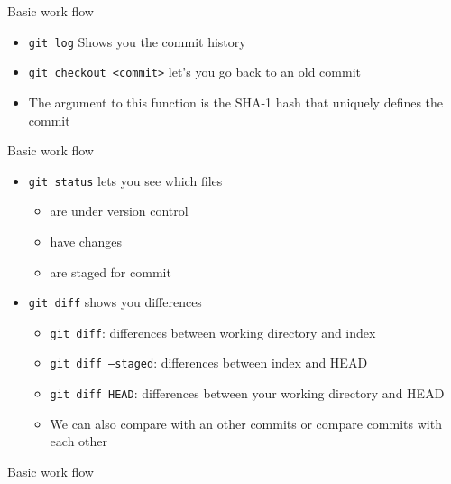 \documentclass[12pt]{beamer}
\begin{document}
\begin{frame}[fragile]{Basic work flow}
	\begin{itemize}
		\item \texttt{git log} Shows you the commit history 
		\item \texttt{git checkout <commit>} let's you go back to an old commit
		\item The argument to this function is the SHA-1 hash that uniquely defines the commit
	\end{itemize}
\end{frame}


\begin{frame}[fragile]{Basic work flow}
\begin{itemize}
\item \texttt{git status} lets you see which files
\begin{itemize}
\item are under version control
\item have changes
\item are staged for commit
\end{itemize}
\item \texttt{git diff} shows you differences
\begin{itemize}
\item \texttt{git diff}: differences between working directory and index
\item \texttt{git diff --staged}: differences between index and HEAD 
\item \texttt{git diff HEAD}:  differences between your working directory and HEAD
\item We can also compare with an other commits or compare commits with each other
\end{itemize}

\end{itemize}
\end{frame}

\begin{frame}[fragile]{Basic work flow}
	\def\blockdist{2.3cm}
\end{frame}
\end{document}
